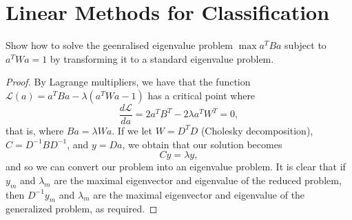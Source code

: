 \chapter{Linear Methods for Classification}

\begin{exer}
    Show how to solve the geenralised eigenvalue problem $\max a^T B a$ subject to $a^T W a = 1$ by transforming it to a standard eigenvalue problem.
\end{exer}

\begin{proof}
    By Lagrange multipliers, we have that the function $\mathcal{L}(a) = a^T B a - \lambda(a^T W a - 1)$ has a critical point where \[
        \frac{d \mathcal{L}}{da} = 2 a^T B^T - 2 \lambda a^T W^T = 0,
        \] that is, where $Ba = \lambda Wa$.  If we let $W = D^T D$ (Cholesky decomposition), $C = D^{-1} B D^{-1}$, and $y = Da$, we obtain that our solution becomes \[
            Cy = \lambda y,
            \] and so we can convert our problem into an eigenvalue problem.  It is clear that if $y_m$ and $\lambda_m$ are the maximal eigenvector and eigenvalue of the reduced problem, then $D^{-1} y_m$ and $\lambda_m$ are the maximal eigenvector and eigenvalue of the generalized problem, as required.
\end{proof}



